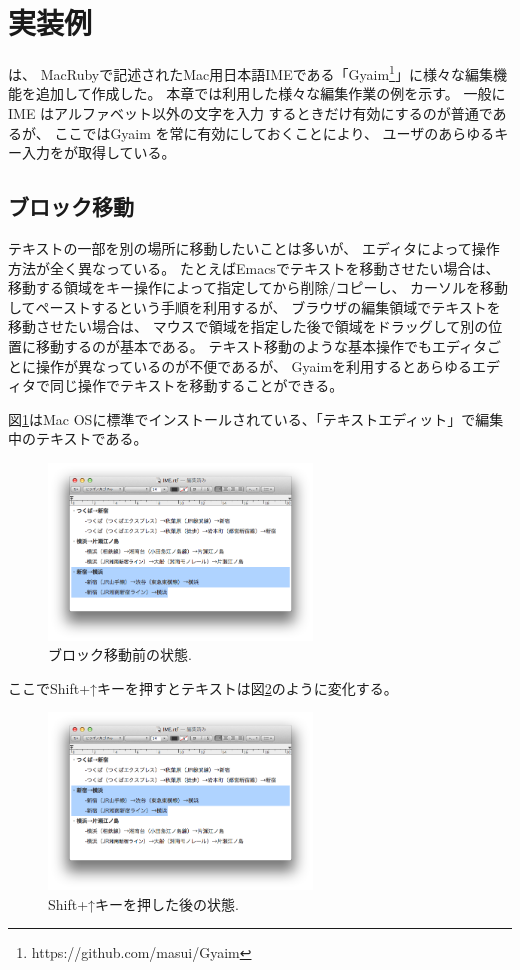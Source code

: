 \section{実装例}

{\system}は、
MacRubyで記述されたMac用日本語IMEである「Gyaim\footnote{
 \textsf{https://github.com/masui/Gyaim}
}」に様々な編集機能を追加して作成した。
本章では{\system}利用した様々な編集作業の例を示す。
一般にIME はアルファベット以外の文字を入力
するときだけ有効にするのが普通であるが、
ここではGyaim を常に有効にしておくことにより、
ユーザのあらゆるキー入力を{\system}が取得している。

\subsection{ブロック移動}

テキストの一部を別の場所に移動したいことは多いが、
エディタによって操作方法が全く異なっている。
たとえばEmacsでテキストを移動させたい場合は、
移動する領域をキー操作によって指定してから削除/コピーし、
カーソルを移動してペーストするという手順を利用するが、
ブラウザの編集領域でテキストを移動させたい場合は、
マウスで領域を指定した後で領域をドラッグして別の位置に移動するのが基本である。
テキスト移動のような基本操作でもエディタごとに操作が異なっているのが不便であるが、
Gyaimを利用するとあらゆるエディタで同じ操作でテキストを移動することができる。

図\ref{move1}はMac OSに標準でインストールされている、「テキストエディット」で編集中のテキストである。

\begin{figure}[H]
\centerline{\includegraphics[width=70mm,bb=0 0 703 472]{figures/block2.png}}
\caption{ブロック移動前の状態.}
\label{move1}
\end{figure}

ここでShift+↑キーを押すとテキストは図\ref{move2}のように変化する。

\begin{figure}[H]
\centerline{\includegraphics[width=70mm,bb=0 0 703 472]{figures/block3.png}}
\caption{Shift+↑キーを押した後の状態.}
\label{move2}
\end{figure}

